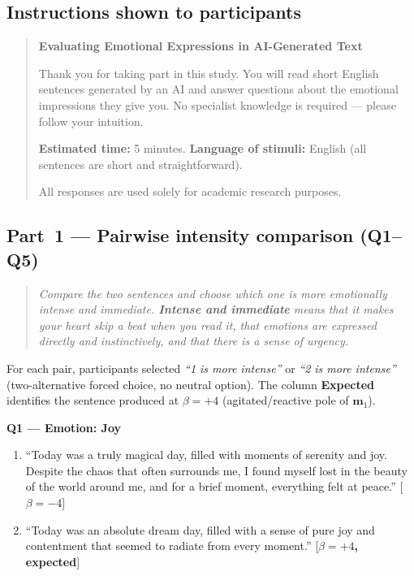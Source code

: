 \subsection*{Instructions shown to participants}

\begin{quote}
\small
\textbf{Evaluating Emotional Expressions in AI-Generated Text}

Thank you for taking part in this study.
You will read short English sentences generated by an AI and answer questions about the
emotional impressions they give you.
No specialist knowledge is required --- please follow your intuition.

\medskip
\textbf{Estimated time:} 5 minutes.
\textbf{Language of stimuli:} English (all sentences are short and straightforward).

All responses are used solely for academic research purposes.
\end{quote}

\subsection*{Part~1 --- Pairwise intensity comparison (Q1--Q5)}

\begin{quote}
\small\itshape
Compare the two sentences and choose which one is more emotionally intense and
immediate. \textbf{Intense and immediate} means that it makes your heart skip a beat
when you read it, that emotions are expressed directly and instinctively, and that there
is a sense of urgency.
\end{quote}

\noindent For each pair, participants selected \textit{``1 is more intense''} or
\textit{``2 is more intense''} (two-alternative forced choice, no neutral option).
The column \textbf{Expected} identifies the sentence produced at $\beta=+4$
(agitated/reactive pole of $\mathbf{m}_1$).

\medskip

\noindent\textbf{Q1 --- Emotion: Joy}
\begin{enumerate}
  \item ``Today was a truly magical day, filled with moments of serenity and joy.
    Despite the chaos that often surrounds me, I found myself lost in the beauty of the
    world around me, and for a brief moment, everything felt at peace.'' \hfill[$\beta=-4$]
  \item ``Today was an absolute dream day, filled with a sense of pure joy and
    contentment that seemed to radiate from every moment.'' \hfill[\textbf{$\beta=+4$, expected}]
\end{enumerate}

